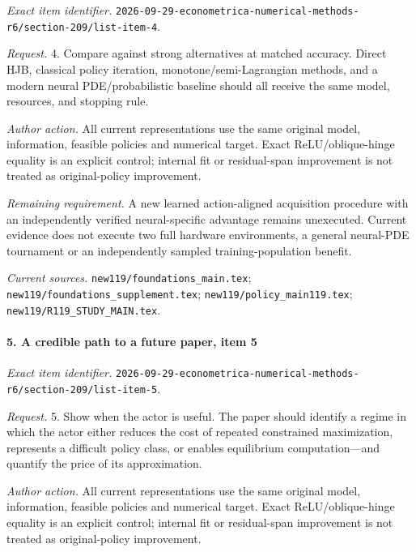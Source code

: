 \emph{Exact item identifier.} \nolinkurl{2026-09-29-econometrica-numerical-methods-r6/section-209/list-item-4}.

\par\emph{Request.} 4. Compare against strong alternatives at matched accuracy. Direct HJB, classical policy iteration, monotone/\allowbreak{}semi-Lagrangian methods, and a modern neural PDE/\allowbreak{}probabilistic baseline should all receive the same model, resources, and stopping rule.

\par\emph{Author action.} All current representations use the same original model, information, feasible policies and numerical target. Exact ReLU/\allowbreak{}oblique-hinge equality is an explicit control; internal fit or residual-span improvement is not treated as original-policy improvement.

\par\emph{Remaining requirement.} A new learned action-aligned acquisition procedure with an independently verified neural-specific advantage remains unexecuted. Current evidence does not execute two full hardware environments, a general neural-PDE tournament or an independently sampled training-population benefit.

\par\emph{Current sources.} \nolinkurl{new119/foundations_main.tex}; \nolinkurl{new119/foundations_supplement.tex}; \nolinkurl{new119/policy_main119.tex}; \nolinkurl{new119/R119_STUDY_MAIN.tex}.

\paragraph{5. A credible path to a future paper, item 5}

\emph{Exact item identifier.} \nolinkurl{2026-09-29-econometrica-numerical-methods-r6/section-209/list-item-5}.

\par\emph{Request.} 5. Show when the actor is useful. The paper should identify a regime in which the actor either reduces the cost of repeated constrained maximization, represents a difficult policy class, or enables equilibrium computation---and quantify the price of its approximation.

\par\emph{Author action.} All current representations use the same original model, information, feasible policies and numerical target. Exact ReLU/\allowbreak{}oblique-hinge equality is an explicit control; internal fit or residual-span improvement is not treated as original-policy improvement.

